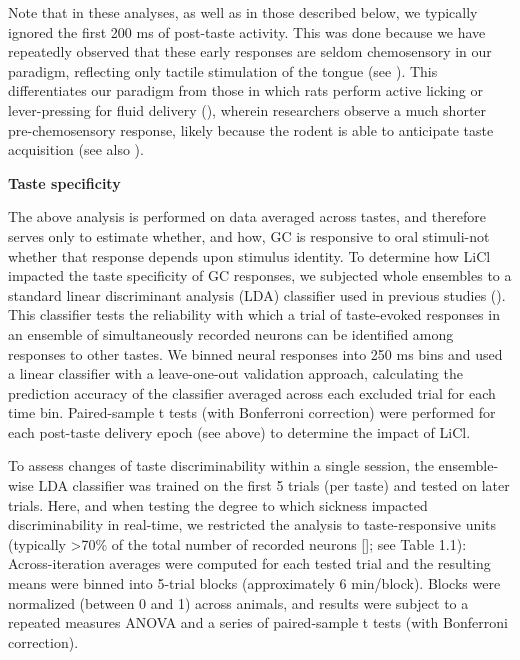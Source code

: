 \begin{refsection}
Note that in these analyses, as well as in those described below, we typically ignored the first 200 ms of post-taste activity. This was done because we have repeatedly observed that these early responses are seldom chemosensory in our paradigm, reflecting only tactile stimulation of the tongue (see \cite{fontanini2006a,katz-a,katz2001a,sadacca2016a,sadacca2012a,jones2007a}). This differentiates our paradigm from those in which rats perform active licking or lever-pressing for fluid delivery (\cite{gutierrez2010a,stapleton2006a,graham2014a,bouaichi2020a,dikecligil2020a}), wherein researchers observe a much shorter pre-chemosensory response, likely because the rodent is able to anticipate taste acquisition (see also \cite{li2016a}).

\smallskip
\noindent\textbf{Taste specificity}\par
\noindent 
The above analysis is performed on data averaged across tastes, and therefore serves only to estimate whether, and how, GC is responsive to oral stimuli-not whether that response depends upon stimulus identity. To determine how LiCl impacted the taste specificity of GC responses, we subjected whole ensembles to a standard linear discriminant analysis (LDA) classifier used in previous studies (\cite{katz2001a,sadacca2016a,nicolelis1997a}). This classifier tests the reliability with which a trial of taste-evoked responses in an ensemble of simultaneously recorded neurons can be identified among responses to other tastes. We binned neural responses into 250 ms bins and used a linear classifier with a leave-one-out validation approach, calculating the prediction accuracy of the classifier averaged across each excluded trial for each time bin. Paired-sample t tests (with Bonferroni correction) were performed for each post-taste delivery epoch (see above) to determine the impact of LiCl.

To assess changes of taste discriminability within a single session, the ensemble-wise LDA classifier was trained on the first 5 trials (per taste) and tested on later trials. Here, and when testing the degree to which sickness impacted discriminability in real-time, we restricted the analysis to taste-responsive units (typically \textgreater70\% of the total number of recorded neurons [\cite{katz-a,katz2001a,jones2007a}]; see Table 1.1): Across-iteration averages were computed for each tested trial and the resulting means were binned into 5-trial blocks (approximately 6 min/block). Blocks were normalized (between 0 and 1) across animals, and results were subject to a repeated measures ANOVA and a series of paired-sample t tests (with Bonferroni correction).


\end{refsection}
